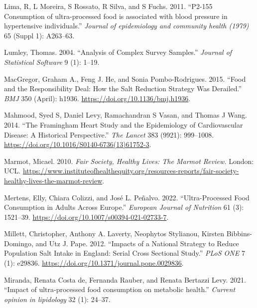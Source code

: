 \documentclass[
]{article}
\newlength{\cslhangindent}
\newlength{\cslentryspacingunit} %
\newenvironment{CSLReferences}[2] %
 {%
  \setlength{\parindent}{0pt}
  \ifodd #1
  \let\oldpar\par
  \def\par{\hangindent=\cslhangindent\oldpar}
  \fi
  \setlength{\parskip}{#2\cslentryspacingunit}
 }%
 {}
\begin{document}
\begin{CSLReferences}{1}{0}
\leavevmode{}%
Lima, R, L Moreira, S Rossato, R Silva, and S Fuchs. 2011. {``P2-155
Consumption of ultra-processed food is associated with blood pressure in
hypertensive individuals.''} \emph{Journal of epidemiology and community
health (1979)} 65 (Suppl 1): A263--63.

\leavevmode{}%
Lumley, Thomas. 2004. {``Analysis of Complex Survey Samples.''}
\emph{Journal of Statistical Software} 9 (1): 1--19.

\leavevmode{}%
MacGregor, Graham A., Feng J. He, and Sonia Pombo-Rodrigues. 2015.
{``Food and the Responsibility Deal: How the Salt Reduction Strategy Was
Derailed.''} \emph{BMJ} 350 (April): h1936.
\url{https://doi.org/10.1136/bmj.h1936}.

\leavevmode{}%
Mahmood, Syed S, Daniel Levy, Ramachandran S Vasan, and Thomas J Wang.
2014. {``The Framingham Heart Study and the Epidemiology of
Cardiovascular Disease: A Historical Perspective.''} \emph{The Lancet}
383 (9921): 999--1008.
\url{https://doi.org/10.1016/S0140-6736(13)61752-3}.

\leavevmode{}%
Marmot, Micael. 2010. \emph{Fair Society, Healthy Lives: The Marmot
Review.} London: UCL.
\url{https://www.instituteofhealthequity.org/resources-reports/fair-society-healthy-lives-the-marmot-review}.

\leavevmode{}%
Mertens, Elly, Chiara Colizzi, and José L. Peñalvo. 2022.
{``Ultra-Processed Food Consumption in Adults Across Europe.''}
\emph{European Journal of Nutrition} 61 (3): 1521--39.
\url{https://doi.org/10.1007/s00394-021-02733-7}.

\leavevmode{}%
Millett, Christopher, Anthony A. Laverty, Neophytos Stylianou, Kirsten
Bibbins-Domingo, and Utz J. Pape. 2012. {``Impacts of a National
Strategy to Reduce Population Salt Intake in England: Serial Cross
Sectional Study.''} \emph{PLoS ONE} 7 (1): e29836.
\url{https://doi.org/10.1371/journal.pone.0029836}.

\leavevmode{}%
Miranda, Renata Costa de, Fernanda Rauber, and Renata Bertazzi Levy.
2021. {``Impact of ultra-processed food consumption on metabolic
health.''} \emph{Current opinion in lipidology} 32 (1): 24--37.


\end{CSLReferences}
\end{document}
